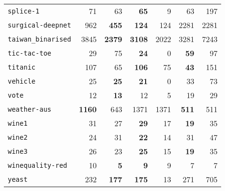 \begin{tabular}{lrrrrrr}
\texttt{splice-1} & 71 & 63 & \textbf{65} & 9 & 63 & 197\\
\texttt{surgical-deepnet} & 962 & \textbf{455} & \textbf{124} & 124 & 2281 & 2281\\
\texttt{taiwan\_binarised} & 3845 & \textbf{2379} & \textbf{3108} & 2022 & 3281 & 7243\\
\texttt{tic-tac-toe} & 29 & 75 & \textbf{24} & 0 & \textbf{59} & 97\\
\texttt{titanic} & 107 & 65 & \textbf{106} & 75 & \textbf{43} & 151\\
\texttt{vehicle} & 25 & \textbf{25} & \textbf{21} & 0 & 33 & 73\\
\texttt{vote} & 12 & \textbf{13} & 12 & 5 & 19 & 29\\
\texttt{weather-aus} & \textbf{1160} & 643 & 1371 & 1371 & \textbf{511} & 511\\
\texttt{wine1} & 31 & 27 & \textbf{29} & 17 & \textbf{19} & 35\\
\texttt{wine2} & 24 & 31 & \textbf{22} & 14 & 31 & 47\\
\texttt{wine3} & 26 & 23 & \textbf{25} & 15 & \textbf{19} & 35\\
\texttt{winequality-red} & 10 & \textbf{5} & \textbf{9} & 9 & 7 & 7\\
\texttt{yeast} & 232 & \textbf{177} & \textbf{175} & 13 & 271 & 705\\
\bottomrule
\end{tabular}
